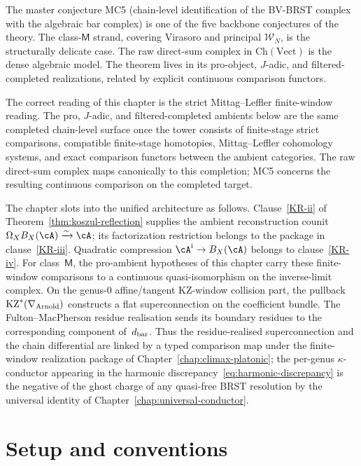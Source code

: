 The master conjecture MC5 (chain-level identification of the BV-BRST
complex with the algebraic bar complex) is one of the five backbone
conjectures of the theory. The class-$\mathsf{M}$ strand, covering
Virasoro and principal $\mathcal{W}_N$, is the structurally delicate
case. The raw direct-sum complex in $\mathrm{Ch}(\mathrm{Vect})$ is
the dense algebraic model.  The theorem lives in its pro-object,
$J$-adic, and filtered-completed realizations, related by explicit
continuous comparison functors.

The correct reading of this chapter is the strict Mittag--Leffler
finite-window reading. The pro, $J$-adic, and filtered-completed
ambients below are the same completed chain-level surface once the
tower consists of finite-stage strict comparisons, compatible
finite-stage homotopies, Mittag--Leffler cohomology systems, and exact
comparison functors between the ambient categories. The raw direct-sum
complex maps canonically to this completion; MC5 concerns the resulting
continuous comparison on the completed target.

The chapter slots into the unified architecture as follows.
Clause~\ref{KR-ii} of Theorem~\ref{thm:koszul-reflection} supplies the
ambient reconstruction counit
$\Omega_XB_X(\cA)\xrightarrow{\sim}\cA$; its factorization restriction
belongs to the package in clause~\ref{KR-iii}.  Quadratic compression
$\cA^{\mathrm i}\to B_X(\cA)$ belongs to clause~\ref{KR-iv}.  For
class~$\mathsf{M}$, the pro-ambient hypotheses of this chapter carry
these finite-window comparisons to a continuous quasi-isomorphism on
the inverse-limit complex.
On the genus-$0$
affine/tangent KZ-window collision part, the pullback
$\mathrm{KZ}^{*}(\nabla_{\mathrm{Arnold}})$ constructs a flat superconnection on the
coefficient bundle.  The Fulton--MacPherson residue realisation sends
its boundary residues to the corresponding component of~$d_{\mathrm{bar}}$.
Thus the residue-realised
superconnection and the chain differential are linked by a typed
comparison map under the finite-window realization package of
Chapter~\ref{chap:climax-platonic}; the per-genus $\kappa$-conductor
appearing in the harmonic
discrepancy~\eqref{eq:harmonic-discrepancy} is the negative of the
ghost charge of any quasi-free BRST resolution by the universal
identity of Chapter~\ref{chap:universal-conductor}.

\section{Setup and conventions}
\label{sec:mc5-setup}

